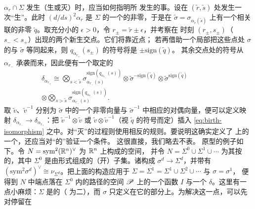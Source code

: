 $\alpha_r\cap\Sigma$ 发生\trGeneric{}\trBifurcation{}（生或灭）时，应当如何指明所
发生的事。设在 $(\tilde{r},\tilde{s})$ 处发生一次“生”。此时 $(d/ds)^2\alpha_r$ 是
$\Sigma$ 的一个\trWellDefined{}的非零\trNormalVector，于是在
$\tilde{\sigma}=\sigma_{\alpha_{\tilde{r}}(\tilde{s})}$ 上有一个相关联的非零\trQuadraticForm
$\tilde{q}$。取充分小的 $\epsilon>0$，令 $r_{\pm}=\tilde{r}\pm\epsilon$，并考察在
时刻 $(r_{\pm},s_{\pm})$（$s_-<s_+$）出现的两个新生交点。它们将靠近\trBifurcation{}点；
若再借助一个局部\trTrivialization{}把这些点处 $\sigma$ 的\trFiber{}与 $\tilde{\sigma}$
等同起来，则 $q_{\alpha_{r_+}}(s_{\pm})$ 的符号将是 $\pm\mathrm{sign}(\tilde{q})$。
其余交点处的符号从 $\alpha_{r_-}$ 承袭而来，因此便有一个取定的\trIsomorphism
\begin{equation}\label{eq:birth-isomorphism}
\begin{split}
\delta_{\alpha_{r_+}}\cong\bigotimes_{s<\tilde{s}}
\sigma_{\alpha_{r_-}(s)}^{\mathrm{sign}(q_{\alpha_{r_-}}(s))}\otimes
\tilde{\sigma}^{-\mathrm{sign}(\tilde{q})}\otimes\tilde{\sigma}^{\mathrm{sign}(\tilde{q})}\qquad\qquad\\
\otimes\bigotimes_{s>\tilde{s}}
\sigma_{\alpha_{r_-}(s)}^{\mathrm{sign}(q_{\alpha_{r_-}}(s))}.
\end{split}
\end{equation}
取 $\tilde{v}$、$\tilde{v}^{-1}$ 分别为 $\tilde{\sigma}$ 中的一个非零向量与
$\tilde{\sigma}^{-1}$ 中相应的对偶向量，便可以定义\trParallelTransport{}映射
$\delta_{\alpha_{r_-}}\to\delta_{\alpha_{r_+}}$：把 $\tilde{v}^{-1}\otimes\tilde{v}$
或 $\tilde{v}\otimes\tilde{v}^{-1}$（视 $\tilde{q}$ 的符号而定）插入
\eqref{eq:birth-isomorphism} 之中。对“灭”的过程则使用相反的规则。要说明这确实定义了%
\trPathSpace{}上的一个\trLineBundle，还应当对“\trHomotopy{}的\trHomotopy”验证一个\trConsistency{}条件。
这很直接，我们略去不表。
原型的例子如下。令 $N=\mathrm{sym}^2(\mathbb{R}^n)^{\vee}$ 为 $\mathbb{R}^n$ 上\trQuadraticForm{}构成的空间，
并令 $N=\Sigma^0\cup\Sigma^1\cup\cdots$ 为其按\trCorank{}的\trStratum，其中
$\Sigma^0$ 是由\trNondegenerate{}形式组成的（开\trDense）子集。诸\trNullSpace{}构成%
\trVectorBundle{} $\sigma^d\to\Sigma^d$，并带有\trTautological{}\trIsomorphism{}
$(\mathrm{sym}^2\sigma^d)^{\vee}\cong\nu_{\Sigma^d}$。把上面的构造应用于
$\Sigma=\overline{\Sigma^1}=\Sigma^1\cup\Sigma^2\cup\cdots$ 与 $\sigma=\sigma^1$，
便得到 $N$ 中端点落在 $\Sigma^0$ 内的路径的空间 $\mathscr{P}$ 上的一个函数 $I$ 与一个%
\trLineBundle{} $\delta$。这里有一点小麻烦：$\Sigma$ 是\trSingular{}的（\trCodimension{}
为二），而 $\sigma$ 只定义在它的\trSmooth{}部分上。为解决这一点，可以先对停留在
